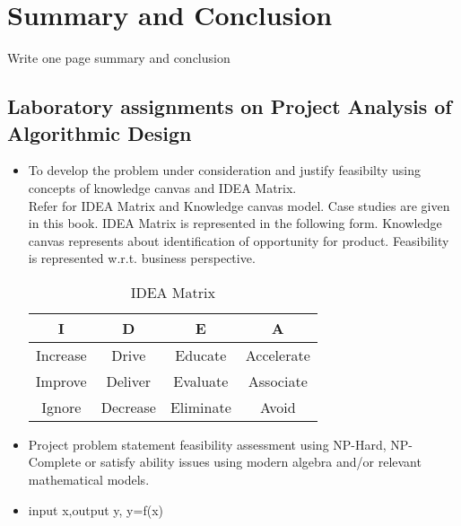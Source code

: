 \documentclass[oneside,a4paper,12pt]{report}
\begin{document}
 
 \chapter{Summary and Conclusion}
Write one page summary and conclusion 




\begin{appendices}


\chapter{Laboratory assignments on Project Analysis of Algorithmic Design}
\begin{itemize}
\item To develop the problem under consideration and justify feasibilty using
concepts of knowledge canvas and IDEA Matrix.\\
Refer \cite{innovationbook} for IDEA Matrix and Knowledge canvas model. Case studies are given in this book. IDEA Matrix is represented in the following form. Knowledge canvas represents about identification  of opportunity for product. Feasibility is represented w.r.t. business perspective.\\ 

\begin{table}[!htbp]
\begin{center}
  \begin{tabular}{| c | c | c | c |}
\hline
 I & D & E & A \\ 
\hline
Increase & Drive & Educate & Accelerate \\
\hline
Improve & Deliver & Evaluate & Associate  \\
 \hline
Ignore & Decrease & Eliminate & Avoid \\
\hline
\end{tabular}
 \caption { IDEA Matrix }
 \label{tab:imatrix}
\end{center}
\end{table}

\item Project problem statement feasibility assessment using NP-Hard, NP-Complete or satisfy ability issues using modern algebra and/or relevant mathematical models.
\item input x,output y, y=f(x)
\end{itemize}











\end{appendices}
\end{document}
